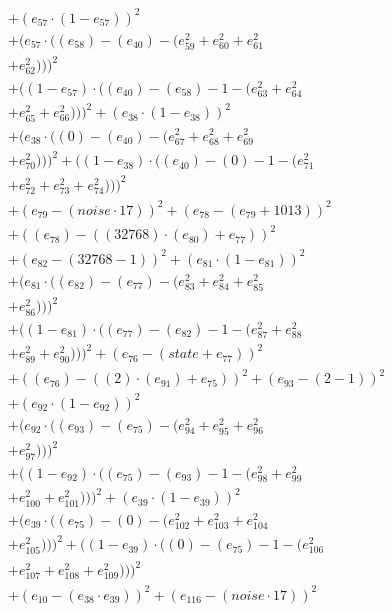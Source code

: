 \documentclass[10pt, a4paper]{article}
\begin{document}
\begin{small}
\begin{align*}
& + (e_{57}  \cdot  (1 - e_{57}))^{2} \\
& + (e_{57}  \cdot  ((e_{58}) - (e_{40}) - (e_{59}^{2} + e_{60}^{2} + e_{61}^{2} \\
& + e_{62}^{2})))^{2} \\
& + ((1 - e_{57})  \cdot  ((e_{40}) - (e_{58}) - 1 - (e_{63}^{2} + e_{64}^{2} \\
& + e_{65}^{2} + e_{66}^{2})))^{2} + (e_{38}  \cdot  (1 - e_{38}))^{2} \\
& + (e_{38}  \cdot  ((0) - (e_{40}) - (e_{67}^{2} + e_{68}^{2} + e_{69}^{2} \\
& + e_{70}^{2})))^{2} + ((1 - e_{38})  \cdot  ((e_{40}) - (0) - 1 - (e_{71}^{2} \\
& + e_{72}^{2} + e_{73}^{2} + e_{74}^{2})))^{2} \\
& + (e_{79} - (noise  \cdot  17))^{2} + (e_{78} - (e_{79} + 1013))^{2} \\
& + ((e_{78}) - ((32768)  \cdot  (e_{80}) + e_{77}))^{2} \\
& + (e_{82} - (32768 - 1))^{2} + (e_{81}  \cdot  (1 - e_{81}))^{2} \\
& + (e_{81}  \cdot  ((e_{82}) - (e_{77}) - (e_{83}^{2} + e_{84}^{2} + e_{85}^{2} \\
& + e_{86}^{2})))^{2} \\
& + ((1 - e_{81})  \cdot  ((e_{77}) - (e_{82}) - 1 - (e_{87}^{2} + e_{88}^{2} \\
& + e_{89}^{2} + e_{90}^{2})))^{2} + (e_{76} - (state + e_{77}))^{2} \\
& + ((e_{76}) - ((2)  \cdot  (e_{91}) + e_{75}))^{2} + (e_{93} - (2 - 1))^{2} \\
& + (e_{92}  \cdot  (1 - e_{92}))^{2} \\
& + (e_{92}  \cdot  ((e_{93}) - (e_{75}) - (e_{94}^{2} + e_{95}^{2} + e_{96}^{2} \\
& + e_{97}^{2})))^{2} \\
& + ((1 - e_{92})  \cdot  ((e_{75}) - (e_{93}) - 1 - (e_{98}^{2} + e_{99}^{2} \\
& + e_{100}^{2} + e_{101}^{2})))^{2} + (e_{39}  \cdot  (1 - e_{39}))^{2} \\
& + (e_{39}  \cdot  ((e_{75}) - (0) - (e_{102}^{2} + e_{103}^{2} + e_{104}^{2} \\
& + e_{105}^{2})))^{2} + ((1 - e_{39})  \cdot  ((0) - (e_{75}) - 1 - (e_{106}^{2} \\
& + e_{107}^{2} + e_{108}^{2} + e_{109}^{2})))^{2} \\
& + (e_{10} - (e_{38}  \cdot  e_{39}))^{2} + (e_{116} - (noise  \cdot  17))^{2} \\

\end{align*}
\end{small}
\end{document}
